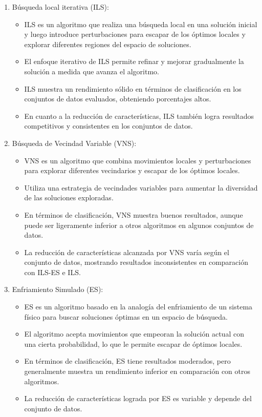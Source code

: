 \begin{enumerate}
	\item Búsqueda local iterativa (ILS):
	\begin{itemize}
		\item  ILS es un algoritmo que realiza una búsqueda local en una solución inicial y luego introduce perturbaciones para escapar de los óptimos locales y explorar diferentes regiones del espacio de soluciones.
		\item  El enfoque iterativo de ILS permite refinar y mejorar gradualmente la solución a medida que avanza el algoritmo.
		\item  ILS muestra un rendimiento sólido en términos de clasificación en los conjuntos de datos evaluados, obteniendo porcentajes altos.
		\item En cuanto a la reducción de características, ILS también logra resultados competitivos y consistentes en los conjuntos de datos.
	\end{itemize}
	
	
	\item Búsqueda de Vecindad Variable (VNS):
	\begin{itemize}
		\item VNS es un algoritmo que combina movimientos locales y perturbaciones para explorar diferentes vecindarios y escapar de los óptimos locales.
		\item Utiliza una estrategia de vecindades variables para aumentar la diversidad de las soluciones exploradas.
		\item En términos de clasificación, VNS muestra buenos resultados, aunque puede ser ligeramente inferior a otros algoritmos en algunos conjuntos de datos.
		\item La reducción de características alcanzada por VNS varía según el conjunto de datos, mostrando resultados inconsistentes en comparación con ILS-ES e ILS.
	\end{itemize}
	
	
	\item Enfriamiento Simulado (ES):
	\begin{itemize}
		\item ES es un algoritmo basado en la analogía del enfriamiento de un sistema físico para buscar soluciones óptimas en un espacio de búsqueda.
		\item El algoritmo acepta movimientos que empeoran la solución actual con una cierta probabilidad, lo que le permite escapar de óptimos locales.
		\item En términos de clasificación, ES tiene resultados moderados, pero generalmente muestra un rendimiento inferior en comparación con otros algoritmos.
		\item La reducción de características lograda por ES es variable y depende del conjunto de datos.
		

\end{itemize}
\end{enumerate}
